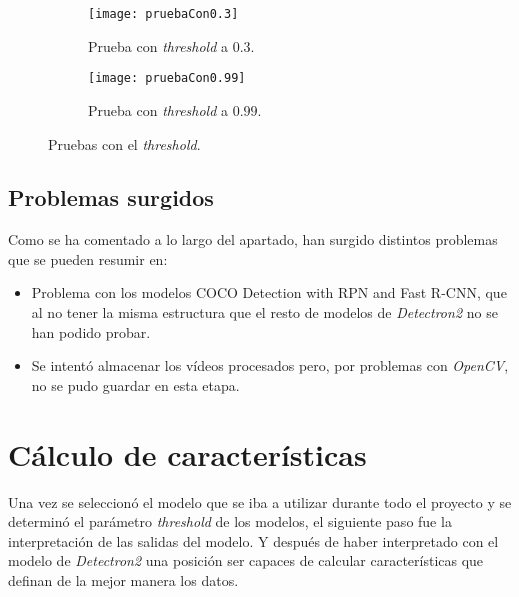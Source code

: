 {\begin{figure}[ht]
	\begin{subfigure}{.5\textwidth}
		\centering
		\texttt{[image: pruebaCon0.3]}
		\caption{Prueba con \textit{threshold} a $0.3$.}
		\label{fig:pruebaCon0.3}
	\end{subfigure}
	\begin{subfigure}{.5\textwidth}
		\centering
		\texttt{[image: pruebaCon0.99]}
		\caption{Prueba con \textit{threshold} a $0.99$.}
		\label{fig:pruebaCon0.99}
	\end{subfigure}
	\caption{Pruebas con el \textit{threshold}.}
	\label{fig:thr}
\end{figure}

\subsection{Problemas surgidos}
Como se ha comentado a lo largo del apartado, han surgido distintos problemas que se pueden resumir en:
\begin{itemize}
	\item Problema con los modelos COCO Detection with RPN and Fast R-CNN, que al no tener la misma estructura que el resto de modelos de \textit{Detectron2} no se han podido probar.
	\item Se intentó almacenar los vídeos procesados pero, por problemas con \textit{OpenCV}, no se pudo guardar en esta etapa.
\end{itemize}

\section{Cálculo de características}
Una vez se seleccionó el modelo que se iba a utilizar durante todo el proyecto y se determinó el parámetro \textit{threshold} de los modelos, el siguiente paso fue la interpretación de las salidas del modelo. Y después de haber interpretado con el modelo de \textit{Detectron2} una posición ser capaces de calcular características que definan de la mejor manera los datos.
}
